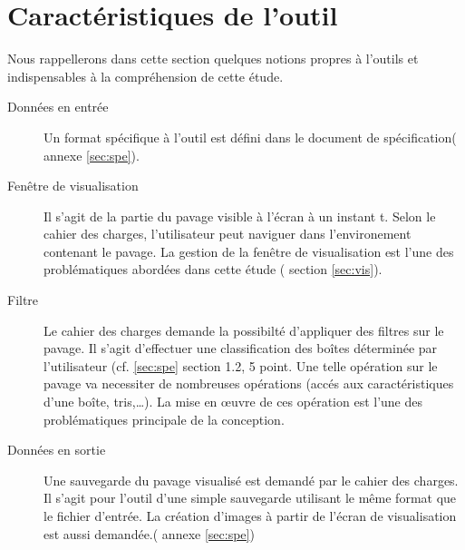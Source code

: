 \section{Caractéristiques de l'outil}
Nous rappellerons dans cette section quelques notions propres à l'outils et indispensables à la compréhension de cette étude.  
\begin{description}
\item[Données en entrée] Un format spécifique à l'outil est défini dans le document de spécification(\cf{} annexe \ref{sec:spe}).
 \item[Fenêtre de visualisation] Il s'agit de la partie du pavage visible à l'écran à un instant t. Selon le cahier des charges, l'utilisateur peut \og naviguer\fg{} dans l'environement contenant le pavage. La gestion de la fenêtre de visualisation est l'une des problématiques abordées dans cette étude (\cf{} section \ref{sec:vis}).
\item[Filtre] Le cahier des charges demande la possibilté d'appliquer des filtres sur le pavage. Il s'agit d'effectuer une classification des boîtes déterminée par l'utilisateur (cf. \ref{sec:spe} section 1.2, 5 point. Une telle opération sur le pavage va necessiter de nombreuses opérations (accés aux caractéristiques d'une boîte, tris,\dots). La mise en œuvre de ces opération est l'une des problématiques principale de la conception.    
\item[Données en sortie] Une sauvegarde du pavage visualisé est demandé par le cahier des charges. Il s'agit pour l'outil d'une simple \og sauvegarde \fg{} utilisant le même format que le fichier d'entrée. La création d'images à partir de l'écran de visualisation est aussi demandée.(\cf{} annexe \ref{sec:spe})
\end{description}